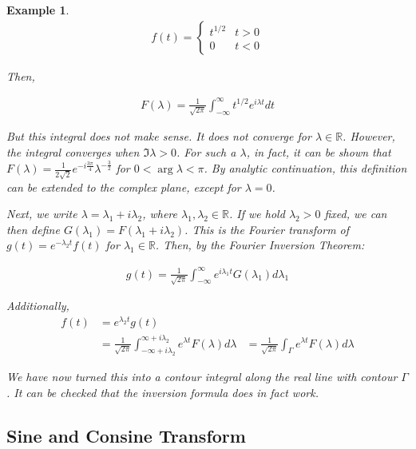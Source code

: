 \documentclass{article}
\newtheorem{ex}{Example}
\theoremstyle{definition}
\def\R{\mathbb{R}}
\begin{document}
\begin{ex}
\begin{align*}
f(t) = \begin{cases}
t^{1/2} &t > 0 \\ 
0 & t < 0
\end{cases}
\end{align*}

Then, 

\begin{align*}
F(\lambda) = \frac{1}{\sqrt{2\pi}}\int_{-\infty}^{\infty} t^{1/2} e^{i\lambda t} dt
\end{align*}

But this integral does not make sense. It does not converge for $\lambda \in \R$. However, the integral converges when $\Im{\lambda} > 0$. For such a $\lambda$, in fact, it can be shown that $F(\lambda) = \frac{1}{2\sqrt{2}} e^{-i\frac{3\pi}{4}} \lambda^{-\frac{3}{2}}$ for $0 < \arg \lambda < \pi$. By analytic continuation, this definition can be extended to the complex plane, except for $\lambda = 0$. 

Next, we write $\lambda = \lambda_1 + i \lambda_2$, where $\lambda_1, \lambda_2 \in \R$. If we hold $\lambda_2 > 0$ fixed, we can then define $G(\lambda_1) = F(\lambda_1 + i \lambda_2)$. This is the Fourier transform of $g(t) = e^{-\lambda_2 t} f(t)$ for $\lambda_1 \in \R$. Then, by the Fourier Inversion Theorem:

\begin{align*}
g(t) = \frac{1}{\sqrt{2\pi}}\int_{-\infty}^{\infty}  e^{i\lambda_1 t} G(\lambda_1) d\lambda_1
\end{align*}

Additionally, 
\begin{align*}
f(t) &= e^{\lambda_2 t} g(t) \\ 
&= \frac{1}{\sqrt{2\pi}}\int_{-\infty+i\lambda_2}^{\infty+i\lambda_2}  e^{\lambda t} F(\lambda) d\lambda
&= \frac{1}{\sqrt{2\pi}}\int_\Gamma  e^{\lambda t} F(\lambda) d\lambda
\end{align*}

We have now turned this into a contour integral along the real line with contour $\Gamma$. It can be checked that the inversion formula does in fact work.

\end{ex}


\subsection{Sine and Consine Transform}
\end{document}

